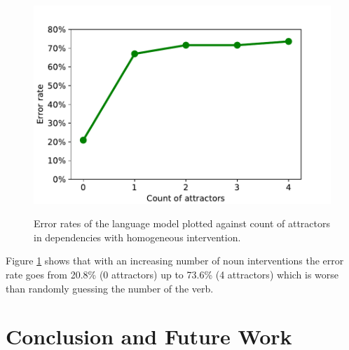 \documentclass[11pt,a4paper]{article}
\begin{document}
    \begin{figure}
    \centering
        \includegraphics[scale=0.5]{2c.pdf}
        \label{fig:2c}
            \caption{Error rates of the language model plotted against count of attractors in dependencies with homogeneous intervention.}
    \end{figure}

Figure \ref{fig:2c} shows that with an increasing number of noun interventions the error rate goes from 20.8\% (0 attractors) up to 73.6\% (4 attractors) which is worse than randomly guessing the number of the verb. 






\section{Conclusion and Future Work}
\label{conclusion}
\end{document}
